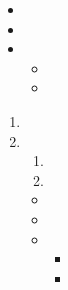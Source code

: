 \documentclass{ctexart}
\begin{document}
\zhlipsum[1]
\begin{itemize}[noindent]
  \item \zhlipsum[1]
  \item \zhlipsum[1]
  \item \begin{itemize}
          \item \zhlipsum[1]
          \item \zhlipsum[1]
        \end{itemize}
\end{itemize}
\zhlipsum[1]
\begin{enumerate}
  \item \zhlipsum[1]
  \item \zhlipsum[1]
  \begin{enumerate}
    \item \zhlipsum[1]
    \item \zhlipsum[1]
  \end{enumerate}
\begin{itemize}
  \item \zhlipsum[1]
  \item \zhlipsum[1]
  \item \begin{itemize}
          \item \zhlipsum[1]
          \item \zhlipsum[1]
        \end{itemize}
\end{itemize}
\end{enumerate}
\end{document}
